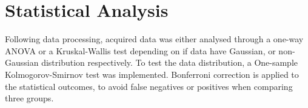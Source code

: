 \section{Statistical Analysis} \label{sec:statistics}

Following data processing, acquired data was either analysed through a one-way ANOVA or a Kruskal-Wallis test depending on if data have Gaussian, or non-Gaussian distribution respectively. To test the data distribution, a One-sample Kolmogorov-Smirnov test was implemented. Bonferroni correction is applied to the statistical outcomes, to avoid false negatives or positives when comparing three groups. 



